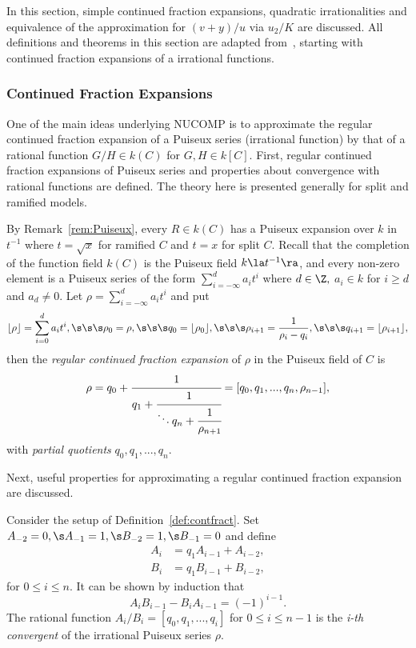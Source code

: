 In this section, simple continued fraction expansions, quadratic irrationalities
and equivalence of the approximation for $(v +y)/u$ via $u_2/K$ are discussed.
All definitions and theorems in this section are adapted
from~\cite{ImbertJacobsonSchmidt_NUCOMP_2010}, starting with continued fraction
expansions of a irrational functions.

\subsubsection{Continued Fraction Expansions} 
One of the main ideas underlying NUCOMP is to approximate the regular continued
fraction expansion of a Puiseux series (irrational function) by that of a
rational function $G/H \in k(C)$ for $G,H \in k[C]$. First, regular continued
fraction expansions of Puiseux series and properties about convergence with
rational functions are defined. The theory here is presented generally for split
and ramified models.

By Remark~\ref{rem:Puiseux}, every $R \in k(C)$ has a Puiseux expansion over $k$
in $t^{-1}$ where $t = \sqrt{x}$ for ramified $C$ and $t = x$ for split $C$.
Recall that the completion of the function field $k(C)$ is the Puiseux field
$k\la t^{-1} \ra$, and every non-zero element is a Puiseux series of the form
$\sum_{i = -\infty}^d a_it^i$ where $d \in \Z,$ $a_i \in k$ for $i \geq d$ and
$a_d \neq 0$. \bd\label{def:contfract}\cite[Adapted from
Section~2.1]{ImbertJacobsonSchmidt_NUCOMP_2010} Let $\rho = \sum_{i = -\infty}^d a_i t^i$ and put
\begin{equation}
\lfloor \rho \rfloor = \sum_{i = 0}^d a_it^i, \s\s\s \rho_0 = \rho, 
\s\s\s q_0 = \lfloor \rho_0 \rfloor, \s\s\s \rho_{i + 1} =
\frac{1}{\rho_i - q_i}, \s\s\s q_{i+1} = \lfloor \rho_{i + 1} \rfloor,
\end{equation} 
then the \emph{regular continued fraction expansion} of $\rho$ in
the Puiseux field of $C$ is $$ \rho = q_0 + \cfrac{1}{q_1 + \cfrac{1}{ \ddots
q_n + \cfrac{1}{\rho_{n+1}}}} = [q_0,q_1,...,q_n,\rho_{n-1}], $$ with
\emph{partial quotients} $q_0,q_1,...,q_n$.
\ed

Next, useful properties for approximating a regular continued fraction expansion
are discussed. 

\bd\label{def:simplefrac}\cite[Adapted from
Section~2.1]{ImbertJacobsonSchmidt_NUCOMP_2010}
Consider the setup of Definition~\ref{def:contfract}. Set $A_{-2} = 0, \s
A_{-1} = 1, \s B_{-2} = 1, \s B_{-1} = 0$ and define
\begin{eqnarray*}
    A_i &= q_1A_{i-1} + A_{i-2}, \\
    B_i &= q_1B_{i-1} + B_{i-2}, 
\end{eqnarray*}
for $0 \leq i \leq n$. It can be shown by induction that
\begin{equation}\label{eq:3} A_iB_{i-1} -B_iA_{i-1} = (-1)^{i-1}.
\end{equation} The rational function $A_i/B_i = [q_0,q_1,...,q_i]$ for $0 \leq i
\leq n-1$ is the \emph{i-th convergent} of the irrational Puiseux series $\rho$.
\ed

